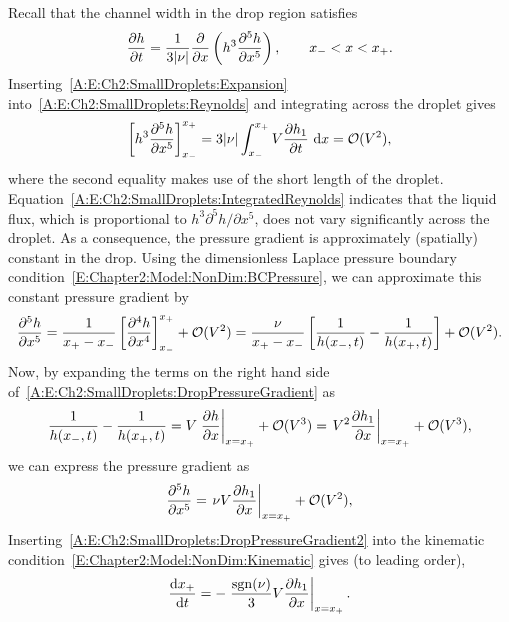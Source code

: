 \begin{subappendices}
Recall that the channel width in the drop region satisfies
\begin{equation}\label{A:E:Ch2:SmallDroplets:Reynolds}
\frac{\partial h}{\partial t} = \frac{1}{3|\nu|}\frac{\partial }{\partial x}\left(h^3 \frac{\partial ^5  h}{\partial x^5}\right), \qquad x_{-} < x <x_{+}.
\end{equation}
Inserting~\eqref{A:E:Ch2:SmallDroplets:Expansion} into~\eqref{A:E:Ch2:SmallDroplets:Reynolds} and integrating across the droplet gives
\begin{equation}\label{A:E:Ch2:SmallDroplets:IntegratedReynolds}
\left[h^3 \frac{\partial ^5 h}{\partial x^5}\right]_{x_{-}}^{x_{+}} =3|\nu| \int_{x_{-}}^{x_{+}} V\frac{\partial h_1}{\partial t}~\mathrm{d}x = \mathcal{O}(V^2),
\end{equation}
where the second equality makes use of the short length of the droplet. Equation~\eqref{A:E:Ch2:SmallDroplets:IntegratedReynolds} indicates that the liquid flux, which is proportional to $h^3 \partial^5h/\partial x^5$, does not vary significantly across the droplet. As a consequence, the pressure gradient is approximately (spatially) constant in the drop. Using the dimensionless Laplace pressure boundary condition~\eqref{E:Chapter2:Model:NonDim:BCPressure}, we can approximate this constant pressure gradient by
\begin{equation}\label{A:E:Ch2:SmallDroplets:DropPressureGradient}
\frac{\partial ^5 h}{\partial x^5} = \frac{1}{x_{+} - x_{-}}\left[\frac{\partial ^4 h}{\partial x^4}\right]_{x_{-}}^{x_{+}} + \mathcal{O}(V^2) =\frac{\nu}{x_{+} - x_{-}}\left[\frac{1}{h(x_{-},t)} - \frac{1}{h(x_{+},t)}\right] + \mathcal{O}(V^2).
\end{equation}
Now, by expanding the terms on the right hand side of~\eqref{A:E:Ch2:SmallDroplets:DropPressureGradient} as
\begin{equation}\label{A:E:Ch2:SmallDroplets:DropPressureChange}
\frac{1}{h(x_{-},t)} - \frac{1}{h(x_{+},t)}  =V\left. \frac{\partial h}{\partial x}\right|_{x = x_{+}} + \mathcal{O}(V^3) = \left.V^2 \frac{\partial h_1}{\partial x}\right|_{x = x_{+}} + \mathcal{O}(V^3),
\end{equation}
we can express the pressure gradient as
\begin{equation}\label{A:E:Ch2:SmallDroplets:DropPressureGradient2}
\frac{\partial ^5 h}{\partial x^5} =\left. \nu V \frac{\partial h_1}{\partial x}\right|_{x =x_{+}}+ \mathcal{O}(V^2),
\end{equation}
Inserting~\eqref{A:E:Ch2:SmallDroplets:DropPressureGradient2} into the kinematic condition~\eqref{E:Chapter2:Model:NonDim:Kinematic} gives (to leading order),
\begin{equation}\label{A:E:Ch2:SmallDroplets:ReducedKinematic}
\frac{\mathrm{d} x_{+}}{\mathrm{d} t} = -\left.\frac{\mathrm{sgn}(\nu)}{3} V\frac{\partial h_1}{\partial x}\right|_{x =x_{+}}.
\end{equation}


\end{subappendices}
